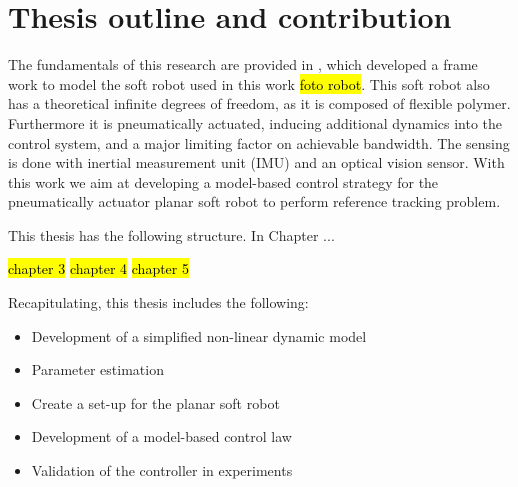 \section{Thesis outline and contribution}

The fundamentals of this research are provided in  \cite{Caasenbrood2020}, which developed a frame work to model the soft robot used in this work \hl{foto robot}. This soft robot also has a theoretical infinite degrees of freedom, as it is composed of flexible polymer. Furthermore it is pneumatically actuated, inducing additional dynamics into the control system, and a major limiting factor on achievable bandwidth. The sensing is done with inertial measurement unit (IMU) and an optical vision sensor. With this work we aim at developing a model-based control strategy for the pneumatically actuator planar soft robot to perform reference tracking problem. 

This thesis has the following structure. In Chapter ...

\hl{chapter 3}
\hl{chapter 4}
\hl{chapter 5}


Recapitulating, this thesis includes the following:


\begin{itemize}
    \item Development of a simplified non-linear dynamic model
    \item Parameter estimation
    \item Create a set-up for the planar soft robot 
    \item Development of a model-based control law
    \item Validation of the controller in experiments
\end{itemize}